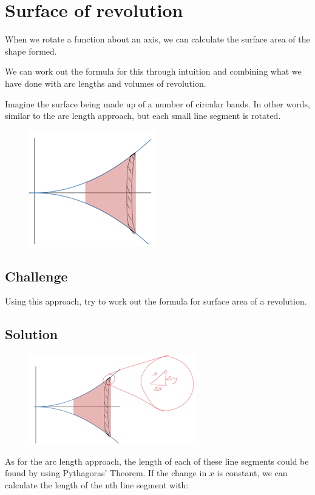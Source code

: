 \documentclass[../main.tex]{subfiles}
\begin{document}
\section{Surface of revolution}
When we rotate a function about an axis, we can calculate the surface area of the shape formed.

We can work out the formula for this through intuition and combining what we have done with arc lengths and volumes of revolution.

Imagine the surface being made up of a number of circular bands. In other words, similar to the arc length approach, but each small line segment is rotated.

\begin{figure}[h]
    \centering
    \includegraphics{images/surfacerev1.png}
\end{figure}

\subsection*{Challenge}
Using this approach, try to work out the formula for surface area of a revolution.
\pagebreak
\subsection*{Solution}
\begin{figure}[h]
    \centering
    \includegraphics{images/surfacerev2.png}
\end{figure}

As for the arc length approach, the length of each of these line segments could be found by using Pythagoras' Theorem. If the change in $x$ is constant, we can calculate the length of the nth line segment with:
\end{document}
